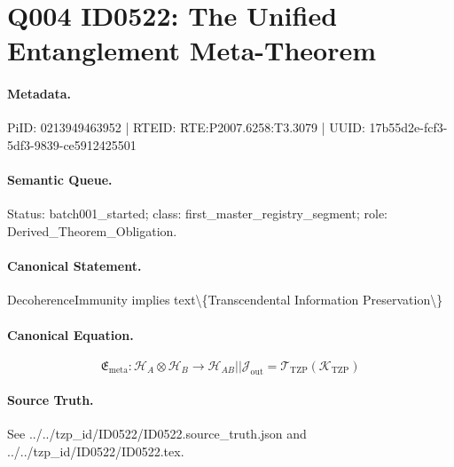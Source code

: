 \section*{Q004 ID0522: The Unified Entanglement Meta-Theorem}
\paragraph{Metadata.}
PiID: 0213949463952 | RTEID: RTE:P2007.6258:T3.3079 | UUID: 17b55d2e-fcf3-5df3-9839-ce5912425501

\paragraph{Semantic Queue.}
Status: batch001\_started; class: first\_master\_registry\_segment; role: Derived\_Theorem\_Obligation.

\paragraph{Canonical Statement.}
DecoherenceImmunity implies text\textbackslash{}\{Transcendental Information Preservation\textbackslash{}\}

\paragraph{Canonical Equation.}
\[
\mathfrak{E}_{\mathrm{meta}}:\mathcal{H}_A\otimes\mathcal{H}_B\longrightarrow \mathcal{H}_{AB} || \mathcal{J}_{\mathrm{out}}=\mathcal{T}_{\mathrm{TZP}}\!\left(\mathcal{K}_{\mathrm{TZP}}\right)
\]

\paragraph{Source Truth.}
See ../../tzp\_id/ID0522/ID0522.source\_truth.json and ../../tzp\_id/ID0522/ID0522.tex.

